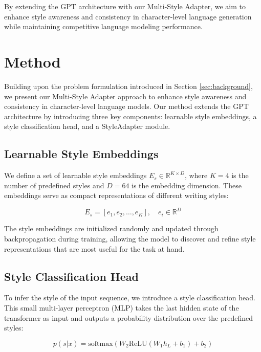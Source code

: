 \documentclass{article} %
\begin{document}
By extending the GPT architecture with our Multi-Style Adapter, we aim to enhance style awareness and consistency in character-level language generation while maintaining competitive language modeling performance.

\section{Method}
\label{sec:method}

Building upon the problem formulation introduced in Section \ref{sec:background}, we present our Multi-Style Adapter approach to enhance style awareness and consistency in character-level language models. Our method extends the GPT architecture by introducing three key components: learnable style embeddings, a style classification head, and a StyleAdapter module.

\subsection{Learnable Style Embeddings}

We define a set of learnable style embeddings $E_s \in \mathbb{R}^{K \times D}$, where $K=4$ is the number of predefined styles and $D=64$ is the embedding dimension. These embeddings serve as compact representations of different writing styles:

\begin{equation}
    E_s = [e_1, e_2, \ldots, e_K], \quad e_i \in \mathbb{R}^D
\end{equation}

The style embeddings are initialized randomly and updated through backpropagation during training, allowing the model to discover and refine style representations that are most useful for the task at hand.

\subsection{Style Classification Head}

To infer the style of the input sequence, we introduce a style classification head. This small multi-layer perceptron (MLP) takes the last hidden state of the transformer as input and outputs a probability distribution over the predefined styles:

\begin{equation}
    p(s|x) = \text{softmax}(W_2 \text{ReLU}(W_1 h_L + b_1) + b_2)
\end{equation}
\end{document}
